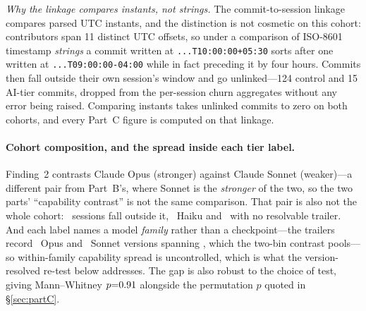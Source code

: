 \emph{Why the linkage compares instants, not strings.} The commit-to-session linkage compares parsed UTC instants, and the distinction is not cosmetic on this cohort: contributors span 11 distinct UTC offsets, so under a comparison of ISO-8601 timestamp \emph{strings} a commit written at \texttt{...T10:00:00+05:30} sorts after one written at \texttt{...T09:00:00-04:00} while in fact preceding it by four hours. Commits then fall outside their own session's window and go unlinked---124 control and 15 AI-tier commits, dropped from the per-session churn aggregates without any error being raised. Comparing instants takes unlinked commits to zero on both cohorts, and every Part~C figure is computed on that linkage.

\paragraph{Cohort composition, and the spread inside each tier label.} Finding~2 contrasts Claude Opus (stronger) against Claude Sonnet (weaker)---a different pair from Part~B's, where Sonnet is the \emph{stronger} of the two, so the two parts' ``capability contrast'' is not the same comparison. That pair is also not the whole cohort: \statPCTierExcluded\ sessions fall outside it, \statPCHaikuSessions\ Haiku and \statPCUnresolvedSessions\ with no resolvable trailer. And each label names a model \emph{family} rather than a checkpoint---the trailers record \statPCOpusVersions\ Opus and \statPCSonnetVersions\ Sonnet versions spanning \statPCVersionSpan, which the two-bin contrast pools---so within-family capability spread is uncontrolled, which is what the version-resolved re-test below addresses. The gap is also robust to the choice of test, giving Mann--Whitney $p{=}0.91$ alongside the permutation $p$ quoted in \S\ref{sec:partC}.

